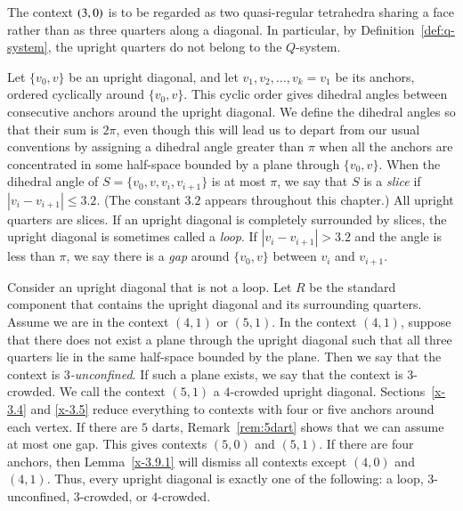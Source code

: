 The context $\relax(3,0)$ is to be regarded as two
quasi-regular tetrahedra sharing a face rather than as three
quarters along a diagonal.  In particular, by
Definition~\ref{def:q-system}, the upright quarters do not belong
to the $Q$-system.

\label{sec:slice}  %

\begin{definition}
Let $\{v_0,v\}$ be an upright diagonal, and let
$v_1,v_2,\ldots,v_k=v_1$ be its anchors, ordered cyclically around
$\{v_0,v\}$.  This cyclic order gives dihedral angles between
consecutive anchors around the upright diagonal. We define the
dihedral angles so that their sum is $2\pi$, even though this will
lead us to depart from our usual conventions by assigning a
dihedral angle greater than $\pi$ when all the anchors are
concentrated in some half-space bounded by a plane through
$\{v_0,v\}$. When the dihedral angle of $S=\{v_0,v,v_i,v_{i+1}\}$ is at
most $\pi$, we say that $S$ is a {\it slice\/} if
$|v_i-v_{i+1}|\le3.2$. (The constant $3.2$ appears throughout this
chapter.) All upright quarters are slices. If an upright
diagonal is completely surrounded by slices, the
upright diagonal is sometimes called a {\it loop}. If
$|v_i-v_{i+1}|>3.2$ and the angle is less than $\pi$, we say there
is a {\it gap\/} around $\{v_0,v\}$ between $v_i$ and $v_{i+1}$.
\end{definition}

\begin{definition}
Consider an upright diagonal that is not a loop. Let $R$ be the
standard component that contains the upright diagonal and its
surrounding quarters.  Assume we are in the context $(4,1)$ or
$(5,1)$.  In the context $(4,1)$, suppose that there does not exist
a plane through the upright diagonal such that all three quarters
lie in the same half-space bounded by the plane. Then we say that
the context is {\it $3$-unconfined}. If such a plane exists, we say
that the context is $3$-crowded. We call the context $(5,1)$ a
$4$-crowded upright diagonal. Sections~\ref{x-3.4} and \ref{x-3.5}
reduce everything to contexts with four or five anchors around each
vertex.  If there are $5$ darts, 
Remark~\ref{rem:5dart} shows that we can assume at most one
gap. This gives contexts $(5,0)$ and $(5,1)$.  If there are four
anchors, then Lemma~\ref{x-3.9.1} will dismiss all contexts except
$(4,0)$ and $(4,1)$. Thus, every upright diagonal is exactly one of
the following: a loop, $3$-unconfined, $3$-crowded, or $4$-crowded.
\end{definition}


